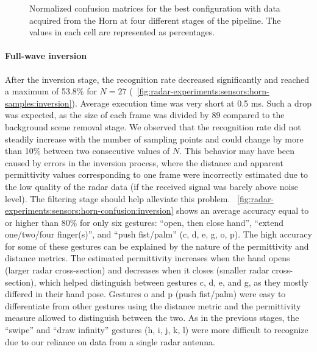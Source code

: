 \begin{figure}[tbp]
    \vspace{-6pt}
    \caption{Normalized confusion matrices for the best configuration with data acquired from the Horn at four different stages of the pipeline. The values in each cell are represented as percentages.}
    \label{fig:radar-experiments:sensors:horn-confusion}
\end{figure}

\paragraph{Full-wave inversion}
After the inversion stage, the recognition rate decreased significantly and reached a maximum of 53.8\% for $N{=}27$ (\fig~\ref{fig:radar-experiments:sensors:horn-samples:inversion}). Average execution time was very short at 0.5 ms. Such a drop was expected, as the size of each frame was divided by 89 compared to the background scene removal stage. 
%
We observed that the recognition rate did not steadily increase with the number of sampling points and could change by more than 10\% between two consecutive values of $N$. This behavior may have been caused by errors in the inversion process, where the distance and apparent permittivity values corresponding to one frame were incorrectly estimated due to the low quality of the radar data (\eg if the received signal was barely above noise level). The filtering stage should help alleviate this problem.
%
\fig~\ref{fig:radar-experiments:sensors:horn-confusion:inversion} shows an average accuracy equal to or higher than 80\% for only six gestures: ``open, then close hand'',  ``extend one/two/four finger(s)'', and ``push fist/palm'' (c, d, e, g, o, p). 
The high accuracy for some of these gestures can be explained by the nature of the permittivity and distance metrics. 
%
The estimated permittivity increases when the hand opens (larger radar cross-section) and decreases when it closes (smaller radar cross-section), which helped distinguish between gestures c, d, e, and g, as they mostly differed in their hand pose.
%
Gestures o and p (push fist/palm) were easy to differentiate from other gestures using the distance metric and the permittivity measure allowed to distinguish between the two.
%
As in the previous stages, the ``swipe'' and ``draw infinity'' gestures (h, i, j, k, l) were more difficult to recognize due to our reliance on data from a single radar antenna.

